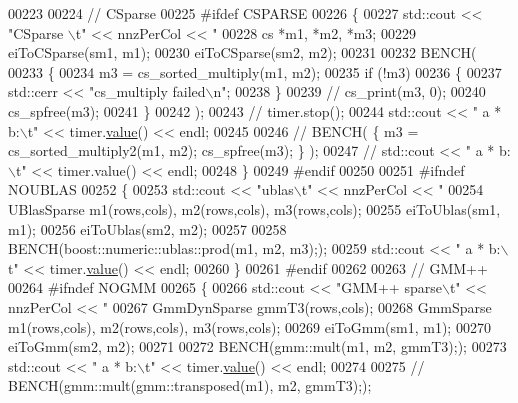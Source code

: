 \begin{DoxyCode}
{{{{{00223 
00224     \textcolor{comment}{// CSparse}
00225 \textcolor{preprocessor}{    #ifdef CSPARSE}
00226     \{
00227       std::cout << \textcolor{stringliteral}{"CSparse \(\backslash\)t"} << nnzPerCol << \textcolor{stringliteral}{"%
00228       cs *m1, *m2, *m3;
00229       eiToCSparse(sm1, m1);
00230       eiToCSparse(sm2, m2);
00231 
00232       BENCH(
00233       \{
00234         m3 = cs\_sorted\_multiply(m1, m2);
00235         \textcolor{keywordflow}{if} (!m3)
00236         \{
00237           std::cerr << \textcolor{stringliteral}{"cs\_multiply failed\(\backslash\)n"};
00238         \}
00239 \textcolor{comment}{//         cs\_print(m3, 0);}
00240         cs\_spfree(m3);
00241       \}
00242       );
00243 \textcolor{comment}{//       timer.stop();}
00244       std::cout << \textcolor{stringliteral}{"   a * b:\(\backslash\)t"} << timer.\hyperlink{class_eigen_1_1_bench_timer_a26760f963ed8b64c126159bfea57735e}{value}() << endl;
00245 
00246 \textcolor{comment}{//       BENCH( \{ m3 = cs\_sorted\_multiply2(m1, m2); cs\_spfree(m3); \} );}
00247 \textcolor{comment}{//       std::cout << "   a * b:\(\backslash\)t" << timer.value() << endl;}
00248     \}
00249 \textcolor{preprocessor}{    #endif}
00250 
00251 \textcolor{preprocessor}{    #ifndef NOUBLAS}
00252     \{
00253       std::cout << \textcolor{stringliteral}{"ublas\(\backslash\)t"} << nnzPerCol << \textcolor{stringliteral}{"%
00254       UBlasSparse m1(rows,cols), m2(rows,cols), m3(rows,cols);
00255       eiToUblas(sm1, m1);
00256       eiToUblas(sm2, m2);
00257 
00258       BENCH(boost::numeric::ublas::prod(m1, m2, m3););
00259       std::cout << \textcolor{stringliteral}{"   a * b:\(\backslash\)t"} << timer.\hyperlink{class_eigen_1_1_bench_timer_a26760f963ed8b64c126159bfea57735e}{value}() << endl;
00260     \}
00261 \textcolor{preprocessor}{    #endif}
00262 
00263     \textcolor{comment}{// GMM++}
00264 \textcolor{preprocessor}{    #ifndef NOGMM}
00265     \{
00266       std::cout << \textcolor{stringliteral}{"GMM++ sparse\(\backslash\)t"} << nnzPerCol << \textcolor{stringliteral}{"%
00267       GmmDynSparse  gmmT3(rows,cols);
00268       GmmSparse m1(rows,cols), m2(rows,cols), m3(rows,cols);
00269       eiToGmm(sm1, m1);
00270       eiToGmm(sm2, m2);
00271 
00272       BENCH(gmm::mult(m1, m2, gmmT3););
00273       std::cout << \textcolor{stringliteral}{"   a * b:\(\backslash\)t"} << timer.\hyperlink{class_eigen_1_1_bench_timer_a26760f963ed8b64c126159bfea57735e}{value}() << endl;
00274 
00275 \textcolor{comment}{//       BENCH(gmm::mult(gmm::transposed(m1), m2, gmmT3););}
}}}}}}}}
\end{DoxyCode}
